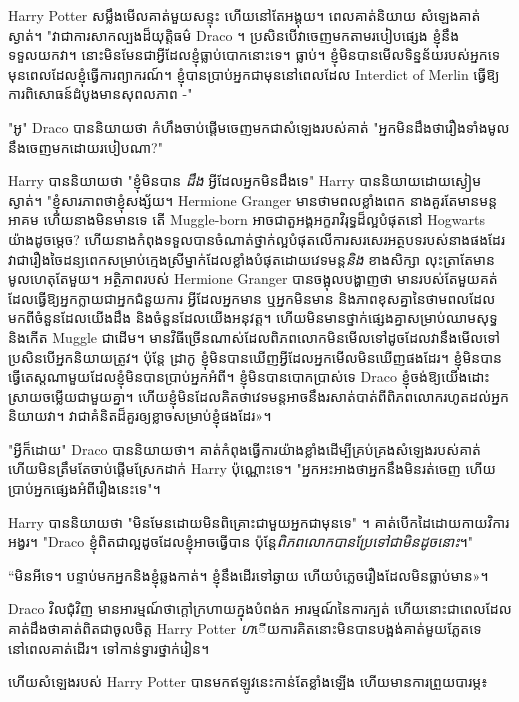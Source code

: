 {{{{Harry Potter សម្លឹងមើលគាត់មួយសន្ទុះ ហើយនៅតែអង្គុយ។ ពេល​គាត់​និយាយ សំឡេង​គាត់​ស្ងាត់។ "វាជាការសាកល្បងដ៏យុត្តិធម៌ Draco ។ ប្រសិនបើវាចេញមកតាមរបៀបផ្សេង ខ្ញុំនឹងទទួលយកវា។ នោះមិនមែនជាអ្វីដែលខ្ញុំធ្លាប់បោកនោះទេ។ ធ្លាប់។ ខ្ញុំមិនបានមើលទិន្នន័យរបស់អ្នកទេ មុនពេលដែលខ្ញុំធ្វើការព្យាករណ៍។ ខ្ញុំបានប្រាប់អ្នកជាមុននៅពេលដែល Interdict of Merlin ធ្វើឱ្យការពិសោធន៍ដំបូងមានសុពលភាព -"

"អូ" Draco បាននិយាយថា កំហឹងចាប់ផ្តើមចេញមកជាសំឡេងរបស់គាត់ "អ្នកមិនដឹងថារឿងទាំងមូលនឹងចេញមកដោយរបៀបណា?"

Harry បាននិយាយថា "ខ្ញុំមិនបាន \emph{ដឹង} អ្វីដែលអ្នកមិនដឹងទេ" Harry បាននិយាយដោយស្ងៀមស្ងាត់។ "ខ្ញុំសារភាពថាខ្ញុំសង្ស័យ។ Hermione Granger មានថាមពលខ្លាំងពេក នាងគួរតែមានមន្តអាគម ហើយនាងមិនមានទេ តើ Muggle-born អាចជាតួអង្គអក្ខរាវិរុទ្ធដ៏ល្អបំផុតនៅ Hogwarts យ៉ាងដូចម្តេច? ហើយនាងកំពុងទទួលបានចំណាត់ថ្នាក់ល្អបំផុតលើការសរសេរអត្ថបទរបស់នាងផងដែរ វាជារឿងចៃដន្យពេកសម្រាប់ក្មេងស្រីម្នាក់ដែលខ្លាំងបំផុតដោយវេទមន្ត\emph{និង} ខាងសិក្សា លុះត្រាតែមានមូលហេតុតែមួយ។ អត្ថិភាពរបស់ Hermione Granger បានចង្អុលបង្ហាញថា មានរបស់តែមួយគត់ដែលធ្វើឱ្យអ្នកក្លាយជាអ្នកជំនួយការ អ្វីដែលអ្នកមាន ឬអ្នកមិនមាន និងភាពខុសគ្នានៃថាមពលដែលមកពីចំនួនដែលយើងដឹង និងចំនួនដែលយើងអនុវត្ត។ ហើយមិនមានថ្នាក់ផ្សេងគ្នាសម្រាប់ឈាមសុទ្ធ និងកើត Muggle ជាដើម។ មានវិធីច្រើនណាស់ដែលពិភពលោកមិនមើលទៅដូចដែលវានឹងមើលទៅ ប្រសិនបើអ្នកនិយាយត្រូវ។ ប៉ុន្តែ ដ្រាកូ ខ្ញុំ​មិន​បាន​ឃើញ​អ្វី​ដែល​អ្នក​មើល​មិន​ឃើញ​ផង​ដែរ។ ខ្ញុំមិនបានធ្វើតេស្តណាមួយដែលខ្ញុំមិនបានប្រាប់អ្នកអំពី។ ខ្ញុំមិនបានបោកប្រាស់ទេ Draco ខ្ញុំ​ចង់​ឱ្យ​យើង​ដោះស្រាយ​ចម្លើយ​ជាមួយ​គ្នា។ ហើយ​ខ្ញុំ​មិន​ដែល​គិត​ថា​វេទមន្ត​អាច​នឹង​រសាត់​បាត់​ពី​ពិភពលោក​រហូត​ដល់​អ្នក​និយាយ​វា​។ វា​ជា​គំនិត​ដ៏​គួរ​ឲ្យ​ខ្លាច​សម្រាប់​ខ្ញុំ​ផង​ដែរ»។

"អ្វីក៏ដោយ" Draco បាននិយាយថា។ គាត់កំពុងធ្វើការយ៉ាងខ្លាំងដើម្បីគ្រប់គ្រងសំឡេងរបស់គាត់ ហើយមិនត្រឹមតែចាប់ផ្តើមស្រែកដាក់ Harry ប៉ុណ្ណោះទេ។ "អ្នក​អះអាង​ថា​អ្នក​នឹង​មិន​រត់​ចេញ ហើយ​ប្រាប់​អ្នក​ផ្សេង​អំពី​រឿង​នេះ​ទេ"។

Harry បាននិយាយថា "មិនមែនដោយមិនពិគ្រោះជាមួយអ្នកជាមុនទេ" ។ គាត់បើកដៃដោយកាយវិការអង្វរ។ "Draco ខ្ញុំពិតជាល្អដូចដែលខ្ញុំអាចធ្វើបាន ប៉ុន្តែ\emph{ពិភពលោកបានប្រែទៅជាមិនដូចនោះ}។"

“មិនអីទេ។ បន្ទាប់មកអ្នកនិងខ្ញុំឆ្លងកាត់។ ខ្ញុំ​នឹង​ដើរ​ទៅ​ឆ្ងាយ ហើយ​បំភ្លេច​រឿង​ដែល​មិន​ធ្លាប់​មាន»។

Draco វិលជុំវិញ មានអារម្មណ៍ថាក្តៅក្រហាយក្នុងបំពង់ក អារម្មណ៍នៃការក្បត់ ហើយនោះជាពេលដែលគាត់ដឹងថាគាត់ពិតជាចូលចិត្ត Harry Potter \emph ហើយការគិតនោះមិនបានបង្អង់គាត់មួយភ្លែតទេនៅពេលគាត់ដើរ។ ទៅកាន់ទ្វារថ្នាក់រៀន។

ហើយ​សំឡេង​របស់ Harry Potter បាន​មក​ឥឡូវ​នេះ​កាន់​តែ​ខ្លាំង​ឡើង ហើយ​មាន​ការ​ព្រួយ​បារម្ភ៖

}}}}
